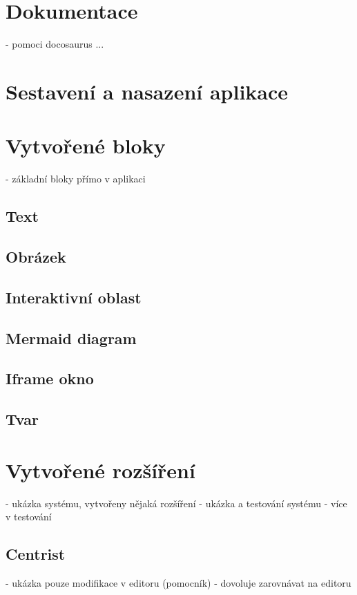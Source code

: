 \section{Dokumentace}

- pomoci docosaurus
...

\section{Sestavení a nasazení aplikace}

\section{Vytvořené bloky}

- základní bloky přímo v aplikaci

\subsection{Text}
\subsection{Obrázek}
\subsection{Interaktivní oblast}
\subsection{Mermaid diagram}
\subsection{Iframe okno}
\subsection{Tvar}

\section{Vytvořené rozšíření}

- ukázka systému, vytvořeny nějaká rozšíření
- ukázka a testování systému
- více v testování

\subsection{Centrist}

- ukázka pouze modifikace v editoru (pomocník)
- dovoluje zarovnávat na editoru

